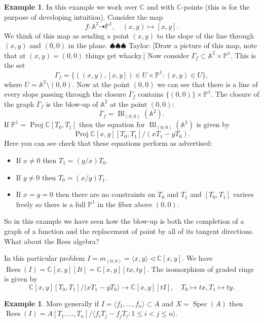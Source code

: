 \documentclass[12pt]{article}
\numberwithin{equation}{section}
\theoremstyle{definition}
\newtheorem{example}[theorem]{Example}
\theoremstyle{remark}
\newcommand{\CC}{\mathbb{C}}
\newcommand{\PP}{\mathbb{P}}
\renewcommand{\AA}{\mathbb{A}}
\newcommand{\Spec}{\operatorname{Spec}}
\newcommand{\Proj}{\operatorname{Proj}}
\newcommand{\Bl}{\operatorname{Bl}}
\newcommand{\Rees}{\operatorname{Rees}}
\newcommand{\taylor}[1]{{\color{blue} \sf $\spadesuit\spadesuit\spadesuit$ Taylor: [#1]}}
\begin{document}
\begin{example}
	In this example we work over $\CC$ and with $\CC$-points (this is for the purpose of developing intuition). 
	Consider the map 
	$$f: \AA^2\dashrightarrow \PP^1, \quad (x,y) \mapsto [x,y]. $$
	We think of this map as sending a point $(x,y)$ to the slope of the line through $(x,y)$ and $(0,0)$ in the plane. \taylor{Draw a picture of this map, note that at $(x,y)=(0,0)$ things get whacky.}
	Now consider $ \Gamma_f \subset \AA^2 \times \PP^1.$
	This is the set 
	 $$ \Gamma_f = \lbrace ( (x,y), [x,y]) \in U \times \PP^1 \colon (x,y) \in U \rbrace,$$
	 where $U = \AA^2 \setminus (0,0)$.
	 Now at the point $(0,0)$ we can see that there is a line of every slope passing through the closure $\overline{\Gamma}_f$ contains $\lbrace (0,0) \rbrace\times \PP^1$.
	 The closure of the graph $\overline{\Gamma}_f$ is the blow-up of $\AA^2$ at the point $(0,0)$:
	  $$ \overline{\Gamma}_f = \Bl_{(0,0)}(\AA^2).$$
	  If $\PP^1 = \Proj \CC[T_0,T_1]$ then the equation for $\Bl_{(0,0)}(\AA^2)$ is given by 
	   $$ \Proj \CC[x,y][T_0,T_1]/(xT_1-yT_0). $$
	  Here you can see check that these equations perform as advertised:
	  \begin{itemize}
	  	\item If $x\neq 0$ then $T_1 =  (y/x)T_0$. 
	  	\item If $y\neq 0$ then $T_0 = (x/y) T_1$. 
	  	\item If $x=y=0$ then there are no constraints on $T_0$ and $T_1$ and $[T_0,T_1]$ variees freely so there is a full $\PP^1$ in the fiber above $(0,0)$. 
	  \end{itemize}
  	 So in this example we have seen how the blow-up is both the completion of a graph of a function and the replacement of point by all of its tangent directions. What about the Rees algebra?
  	 
  	 In this particular problem $I = m_{(0,0)} = \langle x, y \rangle \vartriangleleft \CC[x,y]$. 
  	 We have $\Rees(I) = \CC[x,y][It] = \CC[x,y][tx,ty]$.
  	 The isomorphism of graded rings is given by
  	 $$\CC[x,y][T_0,T_1]/\langle xT_1-yT_0\rangle \to \CC[x,y][tI], \quad T_0\mapsto tx, T_1 \mapsto ty.$$
\end{example}

\begin{example}
	More generally if $I=\langle f_1,\ldots,f_n\rangle \subset A$ and $X= \Spec(A)$ then 
	 $ \Rees(I) = A[T_1,\ldots,T_n]/\langle f_i T_j - f_j T_i \colon 1\leq i< j \leq n \rangle $.
\end{example}
\end{document}
